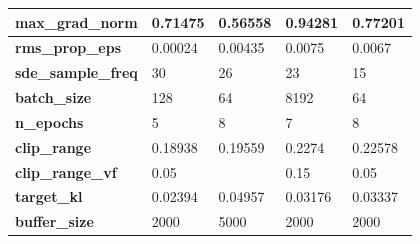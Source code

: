 \documentclass[../xlapes02]{subfiles}
\begin{document}
\begin{table}[h!]
{\begin{tabular}{|l||l|l||l|l|}
                \textbf{max\_grad\_norm}           & 0.71475                                      & 0.56558                                      & 0.94281                                      & 0.77201                                      \\ \hline
                \textbf{rms\_prop\_eps}            & 0.00024                                      & 0.00435                                      & 0.0075                                       & 0.0067                                       \\ \hline
                \textbf{sde\_sample\_freq}         & 30                                           & 26                                           & 23                                           & 15                                           \\ \hline
                \textbf{batch\_size}               & 128                                          & 64                                           & 8192                                         & 64                                           \\ \hline
                \textbf{n\_epochs}                 & 5                                            & 8                                            & 7                                            & 8                                            \\ \hline
                \textbf{clip\_range}               & 0.18938                                      & 0.19559                                      & 0.2274                                       & 0.22578                                      \\ \hline
                \textbf{clip\_range\_vf}           & 0.05                                         & ~                                            & 0.15                                         & 0.05                                         \\ \hline
                \textbf{target\_kl}                & 0.02394                                      & 0.04957                                      & 0.03176                                      & 0.03337                                      \\ \hline
                \textbf{buffer\_size}              & 2000                                         & 5000                                         & 2000                                         & 2000                                         \\ \hline

\end{tabular}}
\end{table}
\end{document}
